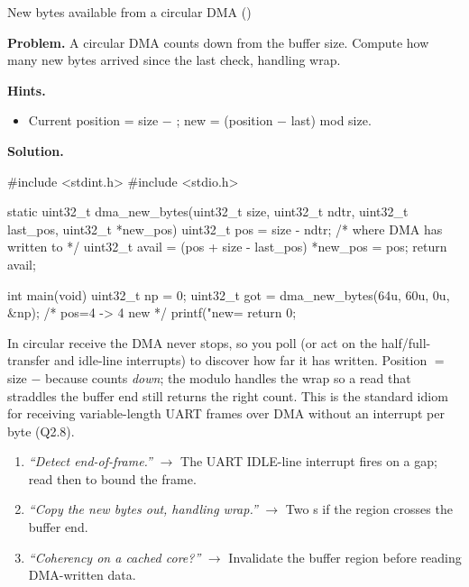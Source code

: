 \begin{gymproblem}{New bytes available from a circular DMA ()}

\textbf{Problem.} A circular DMA counts down  from the buffer size.
Compute how many new bytes arrived since the last check, handling wrap.

\textbf{Hints.}
\begin{itemize}
\item Current position = size $-$ ; new = (position $-$ last) mod
  size.
\end{itemize}

\attempt

\textbf{Solution.}
\begin{cgym}
#include <stdint.h>
#include <stdio.h>

static uint32_t dma_new_bytes(uint32_t size, uint32_t ndtr, uint32_t last_pos,
                              uint32_t *new_pos) {
    uint32_t pos   = size - ndtr;                  /* where DMA has written to */
    uint32_t avail = (pos + size - last_pos) %
    *new_pos = pos;
    return avail;
}

int main(void) {
    uint32_t np = 0;
    uint32_t got = dma_new_bytes(64u, 60u, 0u, &np);   /* pos=4 -> 4 new */
    printf("new=%
    return 0;
}
\end{cgym}

In circular receive the DMA never stops, so you poll  (or act on the
half/full-transfer and idle-line interrupts) to discover how far it has written.
Position $=$ size $-$  because  counts \emph{down}; the
modulo handles the wrap so a read that straddles the buffer end still returns the
right count. This is the standard idiom for receiving variable-length UART
frames over DMA without an interrupt per byte (Q2.8).

\followups
\begin{enumerate}
\item \emph{``Detect end-of-frame.''} $\rightarrow$ The UART IDLE-line
  interrupt fires on a gap; read  then to bound the frame.
\item \emph{``Copy the new bytes out, handling wrap.''} $\rightarrow$ Two
  s if the region crosses the buffer end.
\item \emph{``Coherency on a cached core?''} $\rightarrow$ Invalidate the
  buffer region before reading DMA-written data.
\end{enumerate}
\end{gymproblem}

